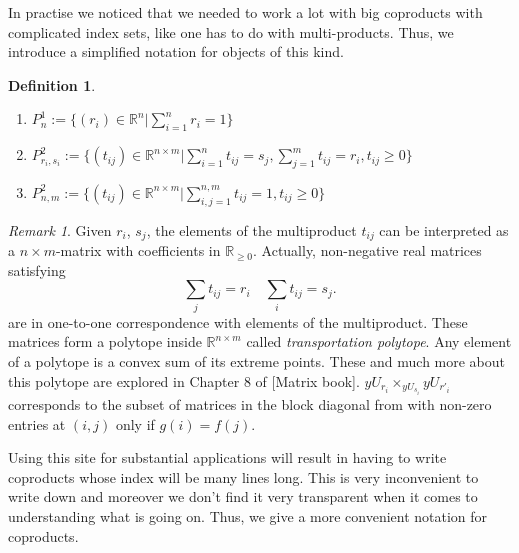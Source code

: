\documentclass[a4paper]{amsproc}
\theoremstyle{plain}
\theoremstyle{definition}
\newtheorem{definition}[theorem]{Definition}
\theoremstyle{remark}
\newtheorem{remark}[theorem]{Remark}
\numberwithin{equation}{section}
\begin{document}
In practise we noticed that we needed to work a lot with big coproducts with complicated index sets, like one has to do with multi-products. Thus, we introduce a simplified notation for objects of this kind.


\begin{definition}
    \begin{enumerate}
        \item $P^1_n := \{ (r_i) \in \mathbb{R}^n | \sum_{i=1}^n r_i = 1 \}$
        \item $P^2_{r_i,s_i} := \{ (t_{ij}) \in \mathbb{R}^{n \times m} | \sum_{i=1}^n t_{ij} = s_j, \sum_{j=1}^m t_{ij} = r_i, t_{ij} \geq 0 \}$
        \item $P^2_{n,m} := \{ (t_{ij}) \in \mathbb{R}^{n \times m} | \sum_{i,j = 1}^{n,m} t_{ij} = 1 , t_{ij} \geq 0 \}$
    \end{enumerate}
\end{definition}

\begin{remark} Given $r_i$, $s_j$, the elements of the multiproduct $t_{ij}$ can be interpreted as a $n\times m$-matrix with coefficients in $\mathbb{R}_{\geq 0}$. Actually, non-negative real matrices satisfying
\[
\sum_j t_{ij} = r_i \quad \sum_i t_{ij} = s_j .
\]
are in one-to-one correspondence with elements of the multiproduct. These matrices form a polytope inside $\mathbb{R}^{n\times m}$ called \emph{transportation polytope}. Any element of a polytope is a convex sum of its extreme points. These and much more about this polytope are explored in Chapter 8 of [Matrix book]. \newline
\indent $yU_{r_i}\times_{yU_{s_i}}yU_{r'_i}$ corresponds to the subset of matrices in the block diagonal from with non-zero entries at $(i,j)$ only if $g(i)=f(j)$.
\end{remark}

Using this site for substantial applications will result in having to write coproducts whose index will be many lines long. This is very inconvenient to write down and moreover we don't find it very transparent when it comes to understanding what is going on. Thus, we give a more convenient notation for coproducts.
\end{document}
